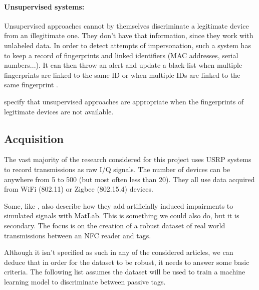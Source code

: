 \paragraph{Unsupervised systems:} Unsupervised approaches cannot by themselves discriminate a legitimate device from an illegitimate one. They don't have that information, since they work with unlabeled data. In order to detect attempts of impersonation, such a system has to keep a record of fingerprints and linked identifiers (MAC addresses, serial numbers...). It can then throw an alert and update a black-list when multiple fingerprints are linked to the same ID or when multiple IDs are linked to the same fingerprint \cite{xu_device_2015, nguyen_device_2011}.

\textcite{xu_device_2015} specify that unsupervised approaches are appropriate when the fingerprints of legitimate devices are not available.

\subsection{Acquisition}

The vast majority of the research considered for this project uses USRP systems to record transmissions as raw I/Q signals. The number of devices can be anywhere from 5 to 500 (but most often less than 20). They all use data acquired from WiFi (802.11) or Zigbee (802.15.4) devices. \cite{riyaz_deep_2018, oyedare_estimating_2019, youssef_machine_2017, morin_transmitter_2019, sankhe_no_2019, nguyen_device_2011}

Some, like \textcite{sankhe_no_2019}, also describe how they add artificially induced impairments to simulated signals with MatLab. This is something we could also do, but it is secondary. The focus is on the creation of a robust dataset of real world transmissions between an NFC reader and tags.

Although it isn't specified as such in any of the considered articles, we can deduce that in order for the dataset to be robust, it needs to answer some basic criteria. The following list assumes the dataset will be used to train a machine learning model to discriminate between passive tags.

